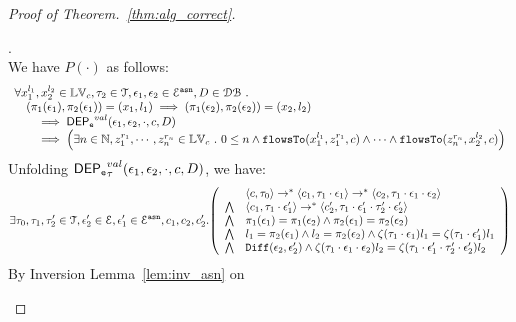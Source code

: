 \begin{proof}[Proof of Theorem.~\ref{thm:alg_correct}]
\begin{case}[$P(\cdot)$].
\label{case:valdep_base}
%
\\
We have $P(\cdot)$ as follows:
%
\[
\begin{array}{l}
\forall {x}_1^{l_1}, {x}_2^{l_2} \in \mathbb{LV}_{{c}}, \mathtt{\tau}_2 \in \mathcal{T}, 
\mathtt{\epsilon}_1, \mathtt{\epsilon}_2 \in \mathcal{E}^{\mathtt{{asn}}}, D \in \mathcal{DB} ~.~
\\ \quad
(\pi_{1}{(\mathtt{\epsilon}_1)}, \pi_{2}{(\mathtt{\epsilon}_1)}) = ({x}_1, l_1)
\implies
(\pi_{1}{(\mathtt{\epsilon}_2)}, \pi_{2}{(\mathtt{\epsilon}_2)}) = ({x}_2, l_2)
 \\ \qquad \implies 
\mathsf{DEP_{\mathtt{e}}}^{val}(\mathtt{\epsilon}_1, \mathtt{\epsilon}_2, \cdot, c, D)
 \\ \qquad \implies
   \Big(\exists  n \in \mathbb{N}, z_1^{r_1}, \cdots, z_n^{r_n} \in \mathbb{LV}_{{c}} ~.~ 0 \leq n
 \land \mathtt{flowsTo}(x_1^{l_1}, z_1^{r_1}, c) \land \cdots \land \mathtt{flowsTo}(z_n^{r_n}, {x}_2^{l_2}, c) \Big)
\end{array}
\]
%
%
%
Unfolding $\mathsf{DEP_{\mathtt{e}}}^{val}_{\mathtt{\tau}}(\mathtt{\epsilon}_1, \mathtt{\epsilon}_2, \cdot, c, D)$, we have:
\[
\exists \vtrace_0,
\vtrace_1, \vtrace_2' \in \mathcal{T}, \event_2' \in \eventset, \event_1' \in \eventset^{\asn}, {c}_1, {c}_2,  {c}_2'.
  \left(
  \begin{array}{ll}   
 & \config{{c}, \vtrace_0} \rightarrow^{*} 
\config{{c}_1, \vtrace_1 \cdot \event_1}  \rightarrow^{*} 
  \config{{c}_2,  \vtrace_1 \cdot \event_1 \cdot \event_2 } 
 \\ 
 \bigwedge &
  \config{{c}_1, \vtrace_1 \cdot \event_1'}  \rightarrow^{*} 
  \config{{c}_2',  \vtrace_1 \cdot \event_1' \cdot \vtrace_2' \cdot \event_2' } 
\\
\bigwedge &  \pi_1(\event_1) = \pi_1(\event_2) \land \pi_2(\event_1) = \pi_2(\event_2) \\
\bigwedge & l_1 = \pi_2(\event_1) \land l_2 = \pi_2(\event_2)
\land \vcounter(\vtrace_1 \cdot \event_1) l_1 = \vcounter(\vtrace_1 \cdot \event_1')l_1 
\\
\bigwedge & 
\diff(\event_2,\event_2' ) \land 
\vcounter(\vtrace_1 \cdot \event_1 \cdot \event_2) l_2
= 
\vcounter(\vtrace_1 \cdot \event_1' \cdot \vtrace_2'\cdot \event_2') l_2\\
\end{array}
\right)
\]
By Inversion Lemma~\ref{lem:inv_asn} on 

\end{case}
\end{proof}
